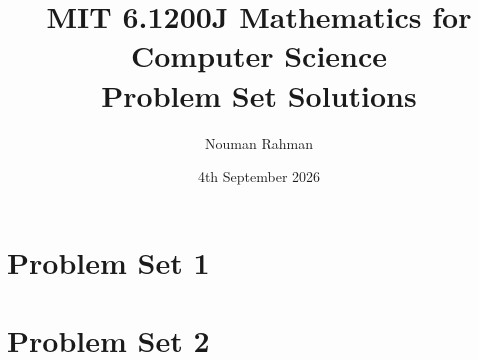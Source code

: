 \documentclass[11pt]{article}
\title{MIT 6.1200J Mathematics for Computer Science \\ Problem Set Solutions}
\author{Nouman Rahman}
\date{4th September 2026}
\begin{document}
\maketitle
\tableofcontents

\newpage
\part{Problem Set 1}


\newpage
\part{Problem Set 2}

\end{document}
